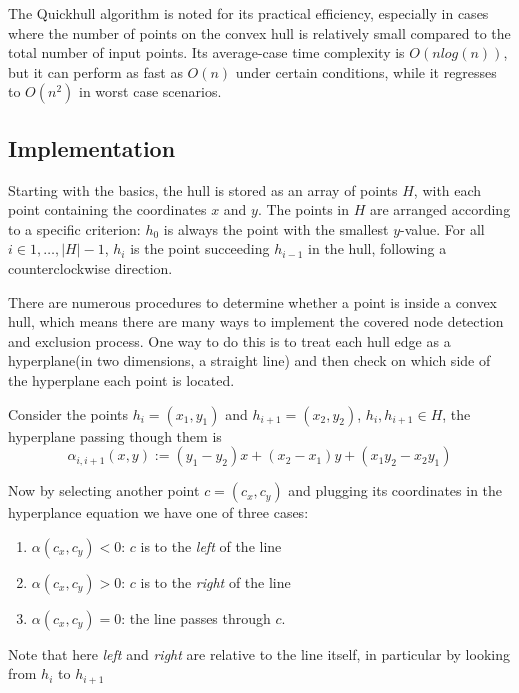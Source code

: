 \documentclass[a4paper]{article}
\begin{document}
The Quickhull algorithm is noted for its practical efficiency, especially in cases where the number of points on the convex hull is relatively small compared to the total number of input points.
Its average-case time complexity is $O(nlog(n))$, but it can perform as fast as $O(n)$ under certain conditions, while it regresses to $O(n^2)$ in worst case scenarios.

\subsection{Implementation}

Starting with the basics, the hull is stored as an array of points $H$, with each point containing the coordinates $x$ and $y$.
The points in $H$ are arranged according to a specific criterion: $h_0$ is always the point with the smallest $y$-value.
For all $i \in {1,\dots,|H|-1}$, $h_i$ is the point succeeding $h_{i-1}$ in the hull, following a counterclockwise direction.

There are numerous procedures to determine whether a point is inside a convex hull, which means there are many ways to implement the covered node detection and exclusion process.
One way to do this is to treat each hull edge as a hyperplane(in two dimensions, a straight line) and then check on which side of the hyperplane each point is located.
\vspace{2mm}

Consider the points $h_i = (x_1, y_1)$ and $h_{i+1} = (x_2, y_2)$, $h_i, h_{i+1} \in H$, the hyperplane passing though them is
\[
	\alpha_{i,i+1}(x,y) := (y_1 - y_2)x + (x_2 - x_1)y + (x_1 y_2 - x_2 y_1)
\] 

Now by selecting another point $c = (c_x, c_y)$ and plugging its coordinates in the hyperplance equation we have one of three cases:
\begin{enumerate}
	\item $\alpha(c_x,c_y) < 0$: $c$ is to the \textit{left} of the line
	\item $\alpha(c_x,c_y) > 0$: $c$ is to the \textit{right} of the line
	\item $\alpha(c_x,c_y) = 0$: the line passes through $c$.
\end{enumerate}

Note that here \textit{left} and \textit{right} are relative to the line itself, in particular by looking from $h_i$ to $h_{i+1}$
\end{document}
